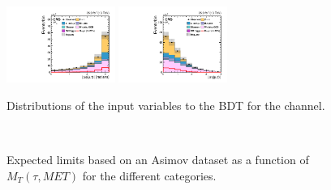 \begin{figure}[htpb]
 \includegraphics[width=0.315\textwidth]{chapter5/BDTvariable/LFV_preselection_m_t_DPhi_Fakes_PoissonErrors.pdf}
 \includegraphics[width=0.315\textwidth]{chapter5/BDTvariable/LFV_preselection_m_t_DEta_Fakes_PoissonErrors.pdf}
\caption{Distributions of the  input variables to the BDT for the \Hmuhad channel.}
 \label{fig:BDT_input_var_mutauhad}
\end{figure}


\begin{figure}[htbp] 
     \centering
     \\
     \caption{Expected limits based on an Asimov dataset as a function of $M_T(\tau, MET)$ for the different categories.}
     \label{fig:BDTvarcorrelation}
\end{figure}


